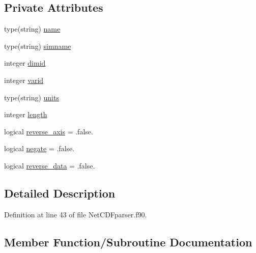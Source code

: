 \subsection*{Private Attributes}
\begin{DoxyCompactItemize}
\item 
type(string) \mbox{\hyperlink{structnetcdfparser__mod_1_1dim__t_ac9200bc4639dedfbd0fe2345ec44d448}{name}}
\item 
type(string) \mbox{\hyperlink{structnetcdfparser__mod_1_1dim__t_a14ab4a777ae4e2429332ddc08f875601}{simname}}
\item 
integer \mbox{\hyperlink{structnetcdfparser__mod_1_1dim__t_ae0eee1b309e61daefc73868795c35cc9}{dimid}}
\item 
integer \mbox{\hyperlink{structnetcdfparser__mod_1_1dim__t_a850c5b53b1fa2c09e19ee37896065897}{varid}}
\item 
type(string) \mbox{\hyperlink{structnetcdfparser__mod_1_1dim__t_a42d4e5dd93905b5b6912dd7675d0e1db}{units}}
\item 
integer \mbox{\hyperlink{structnetcdfparser__mod_1_1dim__t_ad099f35ecc70f2370e69eddfa21235dd}{length}}
\item 
logical \mbox{\hyperlink{structnetcdfparser__mod_1_1dim__t_ae52ef90e32f69fb816c34eef2c25a9c5}{reverse\+\_\+axis}} = .false.
\item 
logical \mbox{\hyperlink{structnetcdfparser__mod_1_1dim__t_a3c5c37fcdaf204d8c51fe4fb0dc21e83}{negate}} = .false.
\item 
logical \mbox{\hyperlink{structnetcdfparser__mod_1_1dim__t_acf99009f46de2c7f946506d74977c2c5}{reverse\+\_\+data}} = .false.
\end{DoxyCompactItemize}


\subsection{Detailed Description}


Definition at line 43 of file Net\+C\+D\+Fparser.\+f90.



\subsection{Member Function/\+Subroutine Documentation}
\mbox{\label{structnetcdfparser__mod_1_1dim__t_aeb8d02051698385d0c46029a9a39c30f}} 
